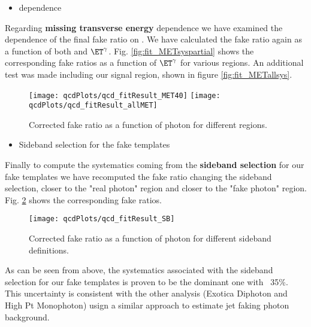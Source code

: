 \begin{itemize}
\item \met dependence
\end{itemize}

Regarding \textbf{missing transverse energy} dependence we have examined the dependence of the final fake ratio on \met.
We have calculated the fake ratio again as a function of both \met and $\ET^{\gamma}$. Fig. \ref{fig:fit_METsyspartial} shows the corresponding fake ratios as a function of $\ET^{\gamma}$ for various \met regions.  An additional test was made including our signal region, shown in figure \ref{fig:fit_METallsys}.

\begin{figure}[!h]
\begin{center}
{\label{fig:fit_METsyspartial}\texttt{[image: qcdPlots/qcd\_fitResult\_MET40]}}
{\label{fig:fit_METallsys}\texttt{[image: qcdPlots/qcd\_fitResult\_allMET]}}
\caption{Corrected fake ratio as a function of photon \et for different \met regions.}
\label{fig:fit_METsys}
\end{center}
\end{figure}

\begin{itemize}
\item Sideband selection for the fake templates
\end{itemize}

Finally to compute the systematics coming from the \textbf{sideband selection} for our fake templates we have recomputed the fake ratio changing the sideband selection, closer to the "real photon" region and closer to the "fake photon" region. Fig. \ref{fig:fit_SIDEBANDsys} shows the corresponding fake ratios.

\begin{figure}[hbtp]
\begin{center}
\texttt{[image: qcdPlots/qcd\_fitResult\_SB]}
\caption{Corrected fake ratio as a function of photon \et for different sideband definitions.}
\label{fig:fit_SIDEBANDsys}
\end{center}
\end{figure}

As can be seen from above, the systematics associated with the sideband selection for our fake templates is proven to be the dominant one with ~35\%. This uncertainty is consistent with the other analysis (Exotica Diphoton and High Pt Monophoton) usign a similar approach to estimate jet faking photon background.

